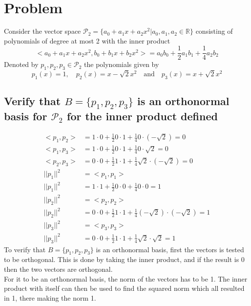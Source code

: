 \documentclass[12pt, a4paper]{article}
\begin{document}
	\section{Problem}
		Consider the vector space $\mathcal{P}_2=\{a_0+a_1x+a_2x^2|a_0,a_1,a_2\in \mathbb{R}\}$ consisting of polynomials of degree at most 2 with the inner product
		$$<a_0+a_1x+a_2x^2,b_0+b_1x+b_2x^2>=a_0b_0+\frac{1}{2}a_1b_1+\frac{1}{4}a_2b_2$$
		Denoted by $p_1,p_2,p_3 \in \mathcal{P}_2$ the polynomials given by
		$$p_1(x)=1,\quad p_2(x)=x-\sqrt{2}x^2\quad \text{and}\quad p_3(x)=x+\sqrt{2}x^2$$
		\subsection{Verify that $B=\{p_1,p_2,p_3\}$ is an orthonormal basis for $\mathcal{P}_2$ for the inner product defined}
			\begin{align*}
				<p_1,p_2>&=1\cdot 0+\frac{1}{2}0\cdot 1+\frac{1}{4}0\cdot (-\sqrt{2})=0\\
				<p_1,p_3>&=1\cdot 0+\frac{1}{2}0\cdot 1+\frac{1}{4}0\cdot \sqrt{2}=0\\
				<p_2,p_3>&=0\cdot 0 +\frac{1}{2}1\cdot 1 + \frac{1}{4}\sqrt{2}\cdot (-\sqrt{2})=0\\
				||p_1||^2&=<p_1,p_1>\\
				||p_1||^2&=1\cdot 1+\frac{1}{2}0\cdot 0+\frac{1}{4}0\cdot 0=1\\
				||p_2||^2&=<p_2,p_2>\\
				||p_2||^2&=0\cdot 0+\frac{1}{2}1\cdot 1+\frac{1}{4}(-\sqrt{2})\cdot (-\sqrt{2})=1\\
				||p_3||^2&=<p_3,p_3>\\
				||p_3||^2&=0\cdot 0+\frac{1}{2}1\cdot 1+\frac{1}{4}\sqrt{2}\cdot \sqrt{2}=1				
			\end{align*}
			To verify that $B=\{p_1,p_2,p_3\}$ is an orthonormal basis, first the vectors is tested to be orthogonal. This is done by taking the inner product, and if the result is 0 then the two vectors are orthogonal.\\
			For it to be an orthonormal basis, the norm of the vectors has to be 1. The inner product with itself can then be used to find the squared norm which all resulted in 1, there making the norm 1.
\end{document}
